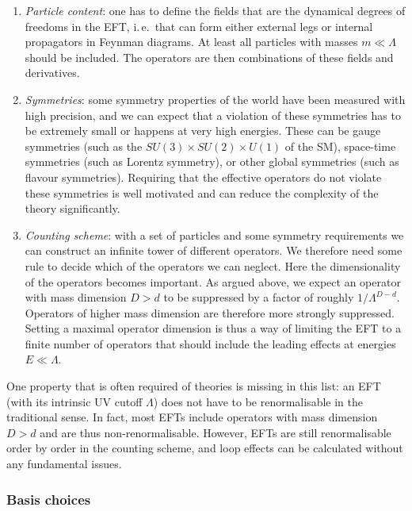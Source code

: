\begin{enumerate}
\item \emph{Particle content}: one has to define the fields that are
  the dynamical degrees of freedoms in the EFT, i.\,e.\ that can form
  either external legs or internal propagators in Feynman diagrams. At
  least all particles with masses $m \ll \Lambda$ should be
  included. The operators are then combinations of these fields and
  derivatives.
%
\item \emph{Symmetries}: some symmetry properties of the world have
  been measured with high precision, and we can expect that a
  violation of these symmetries has to be extremely small or happens
  at very high energies. These can be gauge symmetries (such as the
  $SU(3) \times SU(2) \times U(1)$ of the SM), space-time symmetries
  (such as Lorentz symmetry), or other global symmetries (such as
  flavour symmetries). Requiring that the effective operators do not
  violate these symmetries is well motivated and can reduce the
  complexity of the theory significantly.
%
\item \emph{Counting scheme}: with a set of particles and some
  symmetry requirements we can construct an infinite tower of
  different operators. We therefore need some rule to decide which of
  the operators we can neglect. Here the dimensionality of the
  operators becomes important. As argued above, we expect an operator
  with mass dimension $D > d$ to be suppressed by a factor of roughly
  $1 / \Lambda^{D-d}$. Operators of higher mass dimension are
  therefore more strongly suppressed. Setting a maximal operator
  dimension is thus a way of limiting the EFT to a finite number of
  operators that should include the leading effects at energies
  $E \ll \Lambda$.
\end{enumerate}

One property that is often required of theories is missing in this
list: an EFT (with its intrinsic UV cutoff $\Lambda$) does not have to
be renormalisable in the traditional sense. In fact, most EFTs include
operators with mass dimension $D > d$ and are thus non-renormalisable.
However, EFTs are still renormalisable order by order in the counting
scheme, and loop effects can be calculated without any fundamental
issues. 



\subsubsection{Basis choices}

